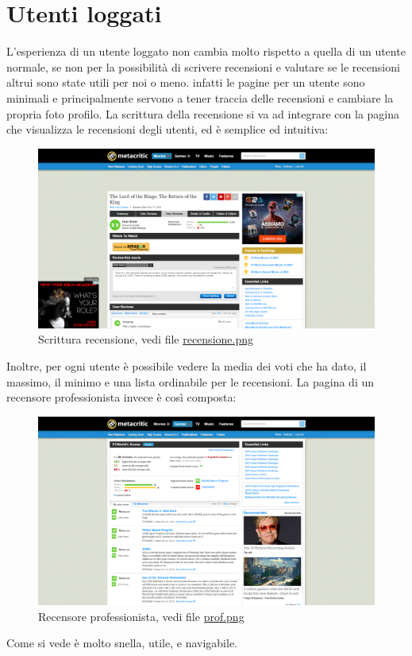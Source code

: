 \documentclass[12pt]{article}
\begin{document}
\section{Utenti loggati}
L'esperienza di un utente loggato non cambia molto rispetto a quella di un utente normale, se non per la possibilità di scrivere recensioni e valutare se le recensioni altrui sono state utili per noi o meno. infatti le pagine per un utente sono minimali e principalmente servono a tener traccia delle recensioni e cambiare la propria foto profilo. La scrittura della recensione si va ad integrare con la pagina che visualizza le recensioni degli utenti, ed è semplice ed intuitiva:
\begin{figure}[H]
	\begin{center}
		\includegraphics[width=13.5cm]{recensione.png}
		\caption{Scrittura recensione, vedi file \href{recensione.png}{recensione.png}}
	\end{center}
\end{figure}
Inoltre, per ogni utente è possibile vedere la media dei voti che ha dato, il massimo, il minimo e una lista ordinabile per le recensioni. La pagina di un recensore professionista invece è così composta:
\begin{figure}[H]
	\begin{center}
		\includegraphics[width=13.5cm]{prof.png}
		\caption{Recensore professionista, vedi file \href{prof.png}{prof.png}}
	\end{center}
\end{figure}
Come si vede è molto snella, utile, e navigabile.
\newpage
\end{document}
